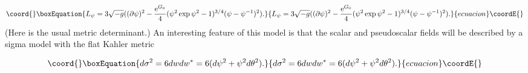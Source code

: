 \documentclass[a4paper,12pt]{article}
\begin{document}
\begin{equation}\coord{}\boxEquation{\label{psi}
    L_{\psi} = 3\sqrt{-g}((\partial \psi)^{2} - \frac{\mathrm{e}^{G_{0}}}{4}
    (\psi^{2}\exp{\psi^{2}-1})^{3/4}(\psi - \psi^{-1})^{2}).
}{L_{\psi} = 3\sqrt{-g}((\partial \psi)^{2} - \frac{\mathrm{e}^{G_{0}}}{4}
    (\psi^{2}\exp{\psi^{2}-1})^{3/4}(\psi - \psi^{-1})^{2}).
}{ecuacion}\coordE{}\end{equation}
(Here \coordHE{} is the usual \coordHE{} metric determinant.) An interesting
feature of this model is that the scalar and pseudoscalar fields
will be described by a sigma model with the flat Kahler metric

\begin{equation}\coord{}\boxEquation{\label{sig}
    d \sigma^{2} = 6dwdw^{*} = 6(d\psi^{2} + \psi^{2}d\theta^{2}).
}{d \sigma^{2} = 6dwdw^{*} = 6(d\psi^{2} + \psi^{2}d\theta^{2}).
}{ecuacion}\coordE{}\end{equation}
\end{document}
